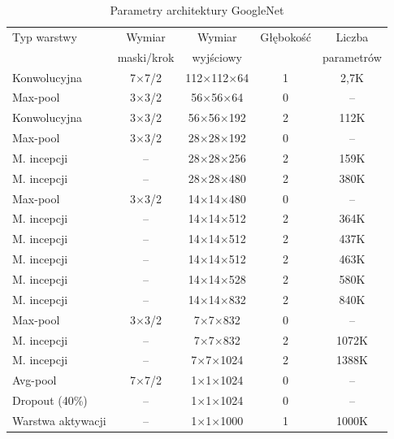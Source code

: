 \begin{table}[h!]
	\setlength{\tabcolsep}{14pt}
	\centering
	\caption{Parametry architektury GoogleNet}
	\scriptsize
	\label{tab:USG-params}
	\begin{tabular}{l | c | c | c | c }
		Typ warstwy  & Wymiar  & Wymiar & Głębokość & Liczba   \\  
		& maski/krok & wyjściowy &&parametrów\\
	    \hline \hline
		Konwolucyjna   & 7$\times$7/2 & 112$\times$112$\times$64 & 1 & 2,7K \\ \hline
		Max-pool & 3$\times$3/2 & 56$\times$56$\times$64 & 0 & --  \\ \hline
		Konwolucyjna & 3$\times$3/2 & 56$\times$56$\times$192 & 2 & 112K  \\ \hline
		Max-pool & 3$\times$3/2 & 28$\times$28$\times$192 & 0 & --  \\ \hline
		M. incepcji & -- & 28$\times$28$\times$256 & 2 & 159K  \\ \hline
		M. incepcji & -- & 28$\times$28$\times$480 & 2 & 380K  \\ \hline
		Max-pool & 3$\times$3/2 & 14$\times$14$\times$480 & 0 & --  \\ \hline
		M. incepcji & -- & 14$\times$14$\times$512 & 2 & 364K  \\ \hline
		M. incepcji & -- & 14$\times$14$\times$512 & 2 & 437K  \\ \hline
		M. incepcji & -- & 14$\times$14$\times$512 & 2 & 463K  \\ \hline
		M. incepcji & -- & 14$\times$14$\times$528 & 2 & 580K  \\ \hline
		M. incepcji & -- & 14$\times$14$\times$832 & 2 & 840K  \\ \hline
		Max-pool & 3$\times$3/2 & 7$\times$7$\times$832 & 0 & --  \\ \hline
		M. incepcji & -- & 7$\times$7$\times$832 & 2 & 1072K  \\ \hline
		M. incepcji & -- & 7$\times$7$\times$1024 & 2 & 1388K  \\ \hline
		Avg-pool & 7$\times$7/2 & 1$\times$1$\times$1024 & 0 & --  \\ \hline
		Dropout (40\%) & -- & 1$\times$1$\times$1024 & 0 & --  \\ \hline
		Warstwa aktywacji & -- & 1$\times$1$\times$1000 & 1 & 1000K  \\ \hline
	\end{tabular}
	\label{GoogleNetParams}
\end{table}

